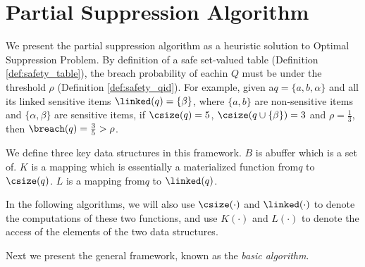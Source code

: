 \section{Partial Suppression Algorithm}
\label{sec:algo}
\renewcommand{\algorithmicforall}{\textbf{for each}}

We present the partial suppression algorithm as a heuristic
solution to Optimal Suppression Problem.
By definition of a safe set-valued table (Definition \ref{def:safety_table}),
the breach probability of each\qid in $Q$
must be under the threshold $\rho$ (Definition \ref{def:safety_qid}).
For example, given a\qid $q=\{a, b, \alpha\}$ and all its linked
sensitive items $\linked(q)=\{\beta\}$, where $\{a, b\}$ are
non-sensitive items and $\{\alpha, \beta\}$ are sensitive items,
if $\csize(q)=5$, $\csize(q \cup \{\beta\})=3$ and
$\rho=\frac{1}{3}$, then $\breach(q)=\frac{3}{5}>\rho$.

\begin{definition}
We define three key data structures in this framework.
$B$ is a\qid buffer which is a set of\qidsx.
$K$ is a mapping which is essentially a materialized function from\qid $q$ to $\csize(q)$.
$L$ is a mapping from\qid $q$ to $\linked(q)$.
\end{definition}
In the following algorithms, we will also use
$\csize(\cdot)$ and $\linked(\cdot)$
to denote the computations of these two functions, and
use $K(\cdot)$ and $L(\cdot)$ to denote the access of the elements
of the two data structures.

Next we present the general framework, known as the {\em basic algorithm}.


